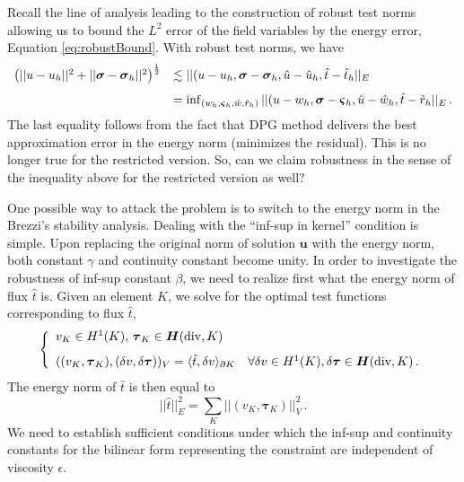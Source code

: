 \documentclass[letterpaper]{article}
\def\bftau{\boldsymbol\tau}
\def\bfvarsigma{\boldsymbol\varsigma}
\newcommand{\LRp}[1]{\left( #1 \right)}
\newcommand{\ptl}{{\partial}}
\newcommand{\bfsig}{\mbox{\boldmath $\sigma$}}
\newcommand{\bfu}{\boldsymbol u}
\newcommand{\bfH}{\mbox{\boldmath $H$}}
\begin{document}
Recall the line of analysis leading to the construction of robust
test norms allowing us to bound the $L^2$ error of the field variables by the
energy error, Equation \ref{eq:robustBound}. With robust test norms, we have
\begin{equation}
\begin{array}{ll}
   \LRp{|| u - u_h ||^2+ || \bfsig - \bfsig_h ||^2}^{\frac{1}{2}}
& \lesssim || (u - u_h, \bfsig - \bfsig_h, \hat{u} - \hat{u}_h, \hat{t} - \hat{t}_h ||_E \\[8pt]
&= \inf_{(w_h,\bfvarsigma_h,\hat{w},\hat{r}_h)}
|| (u - w_h, \bfsig - \bfvarsigma_h, \hat{u} - \hat{w}_h, \hat{t} - \hat{r}_h ||_E\,.
\end{array}
\end{equation}
The last equality follows from the fact that DPG method delivers the best approximation
error in the energy norm (minimizes the residual). This is no longer true for the
restricted version. So, can we claim robustness in the sense of the inequality above
for the restricted version as well?

One possible way to attack the problem is to switch to the energy norm in the Brezzi's stability
analysis. Dealing with the ``inf-sup in kernel'' condition is simple. Upon replacing
the original norm of solution $\bfu$ with the energy norm, both constant $\gamma$ and continuity
constant become unity. In order to investigate the robustness of inf-sup  constant $\beta$,
we need to realize first what the energy norm of flux $\hat{t}$ is. Given an element $K$,
we solve for the optimal test functions corresponding to flux $\hat{t}$,
\begin{equation}
\left\{
\begin{array}{ll}
v_K \in H^1(K),\, \bftau_K \in \bfH(\text{div},K)\\[8pt]
((v_K,\bftau_K), (\delta v,\delta \bftau))_V = \langle \hat{t},\delta v\rangle_{\ptl K}
\quad \forall \delta v \in H^1(K), \delta \bftau \in \bfH(\text{div},K)\,.
\end{array}
\right.
\label{eq:local_problem}
\end{equation}
The energy norm of $\hat{t}$ is then equal to
\begin{equation}
|| \hat{t} ||_E^2 = \sum_K || (v_K,\bftau_K) ||_V^2\,.
\end{equation}
We need to establish sufficient conditions under which the inf-sup and continuity constants for
the bilinear form representing the constraint are independent of viscosity $\epsilon$.
\end{document}
